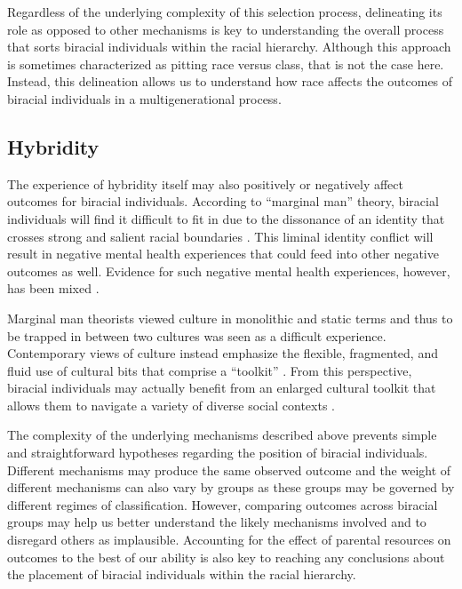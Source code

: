 \documentclass[
  12pt,
  letterpaper,
]{article}
\begin{document}
Regardless of the underlying complexity of this selection process,
delineating its role as opposed to other mechanisms is key to
understanding the overall process that sorts biracial individuals within
the racial hierarchy. Although this approach is sometimes characterized
as pitting race versus class, that is not the case here. Instead, this
delineation allows us to understand how race affects the outcomes of
biracial individuals in a multigenerational process.

\hypertarget{hybridity}{%
\subsection{Hybridity}\label{hybridity}}

The experience of hybridity itself may also positively or negatively
affect outcomes for biracial individuals. According to ``marginal man''
theory, biracial individuals will find it difficult to fit in due to the
dissonance of an identity that crosses strong and salient racial
boundaries \autocite{park_human_1928,stonequist_problem_1935}. This
liminal identity conflict will result in negative mental health
experiences that could feed into other negative outcomes as well.
Evidence for such negative mental health experiences, however, has been
mixed
\autocite{udry_health_2003,campbell_what_2006,cheng_multiracial_2009,bratter_does_2011}.

Marginal man theorists viewed culture in monolithic and static terms and
thus to be trapped in between two cultures was seen as a difficult
experience. Contemporary views of culture instead emphasize the
flexible, fragmented, and fluid use of cultural bits that comprise a
``toolkit'' \autocite{swidler_culture_1986,dimaggio_culture_1997}. From
this perspective, biracial individuals may actually benefit from an
enlarged cultural toolkit that allows them to navigate a variety of
diverse social contexts \autocite{shih_multiple_2019}.

The complexity of the underlying mechanisms described above prevents
simple and straightforward hypotheses regarding the position of biracial
individuals. Different mechanisms may produce the same observed outcome
and the weight of different mechanisms can also vary by groups as these
groups may be governed by different regimes of classification. However,
comparing outcomes across biracial groups may help us better understand
the likely mechanisms involved and to disregard others as implausible.
Accounting for the effect of parental resources on outcomes to the best
of our ability is also key to reaching any conclusions about the
placement of biracial individuals within the racial hierarchy.
\end{document}
